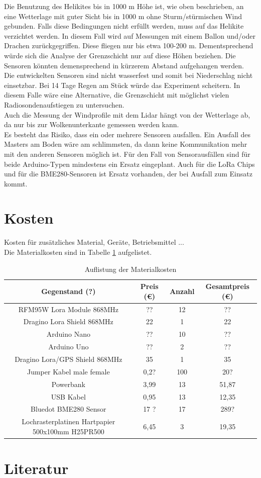\documentclass[a4paper,11pt,DIV=calc,tablecaptionabove,headinclude,twoside]{article}
\begin{document}
Die Benutzung des Helikites bis in 1000 m Höhe ist, wie oben beschrieben, an eine
Wetterlage mit guter Sicht bis in 1000 m ohne Sturm/stürmischen Wind gebunden. Falls diese Bedingungen nicht erfüllt werden, muss
auf das Helikite verzichtet werden. In diesem Fall wird auf Messungen mit einem Ballon und/oder Drachen 
zurückgegriffen. Diese fliegen nur bis etwa 100-200 m. Dementsprechend würde sich die Analyse der Grenzschicht 
nur auf diese Höhen beziehen. Die Sensoren könnten demensprechend in kürzerem Abstand aufgehangen werden.\\
Die entwickelten Sensoren sind nicht wasserfest und somit bei Niederschlag nicht einsetzbar. Bei 14 Tage Regen am Stück
würde das Experiment scheitern. In diesem Falle wäre eine Alternative, die Grenzschicht mit möglichst vielen Radiosondenaufstiegen
zu untersuchen. \\
Auch die Messung der Windprofile mit dem Lidar hängt von der Wetterlage ab, da nur bis zur Wolkenunterkante gemessen werden kann. \\
Es besteht das Risiko, dass ein oder mehrere Sensoren ausfallen. Ein Ausfall des Masters am Boden wäre am
schlimmsten, da dann keine Kommunikation mehr mit den anderen Sensoren möglich ist. Für den Fall von 
Sensorausfällen sind für beide Arduino-Typen mindestens ein Ersatz eingeplant. Auch für die LoRa Chips und für
die BME280-Sensoren ist Ersatz vorhanden, der bei Ausfall zum Einsatz kommt.\\

\section{Kosten}
Kosten für zusätzliches Material, Geräte, Betriebsmittel ...\\
Die Materialkosten sind in Tabelle \ref{Tab:Kosten} aufgelistet.
\begin{table}[h]
\caption{Auflistung der Materialkosten}
\begin{tabular}{|c|c|c|c|}
\hline
Gegenstand (?) & Preis (\euro) & Anzahl & Gesamtpreis (\euro) \\\hline \hline
RFM95W Lora Module 868MHz  & ?? & 12 & ?? \\\hline
Dragino Lora Shield 868MHz & 22 & 1 & 22 \\\hline
Arduino Nano & ?? & 10 & ?? \\\hline
Arduino Uno & ?? & 2 & ?? \\\hline
Dragino Lora/GPS Shield 868MHz & 35 & 1 & 35 \\\hline
Jumper Kabel male female & 0,2? & 100 & 20? \\\hline
Powerbank & 3,99 & 13 & 51,87 \\\hline
USB Kabel & 0,95 & 13 & 12,35 \\\hline
Bluedot BME280 Sensor & 17 ? & 17 & 289? \\\hline
Lochrasterplatinen Hartpapier 500x100mm H25PR500 & 6,45 & 3 & 19,35 \\\hline
\end{tabular}
\label{Tab:Kosten}
\end{table}

\section*{Literatur}

\end{document}
